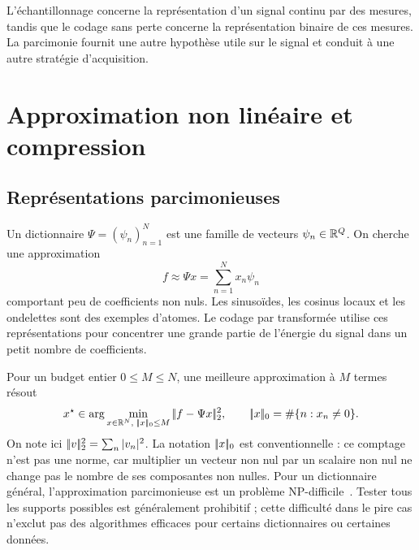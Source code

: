 L'échantillonnage concerne la représentation d'un signal continu par des mesures, tandis que le codage sans perte concerne la représentation binaire de ces mesures. La parcimonie fournit une autre hypothèse utile sur le signal et conduit à une autre stratégie d'acquisition.

\section{Approximation non linéaire et compression}
\subsection{Représentations parcimonieuses}
Un dictionnaire $\Psi=(\psi_n)_{n=1}^N$ est une famille de vecteurs $\psi_n\in\mathbb{R}^Q$. On cherche une approximation
\[
 f\approx\Psi x=\sum_{n=1}^N x_n\psi_n
\]
comportant peu de coefficients non nuls. Les sinusoïdes, les cosinus locaux et les ondelettes sont des exemples d'atomes. Le codage par transformée utilise ces représentations pour concentrer une grande partie de l'énergie du signal dans un petit nombre de coefficients.

Pour un budget entier $0\le M\le N$, une meilleure approximation à $M$ termes résout
\begin{equation}\label{eq-pbm-approx}
 x^\star\in\arg\min_{x\in\mathbb{R}^N,\;|\!| x |\!|_0\le M}|\!| f-\Psi x |\!|_2^2,
 \qquad |\!| x |\!|_0=\#\{n:x_n\ne0\}.
\end{equation}
On note ici $|\!| v |\!|_2^2=\sum_n|v_n|^2$. La notation $|\!| x |\!|_0$ est conventionnelle : ce comptage n'est pas une norme, car multiplier un vecteur non nul par un scalaire non nul ne change pas le nombre de ses composantes non nulles. Pour un dictionnaire général, l'approximation parcimonieuse est un problème NP-difficile~\cite{Natarajan95}. Tester tous les supports possibles est généralement prohibitif ; cette difficulté dans le pire cas n'exclut pas des algorithmes efficaces pour certains dictionnaires ou certaines données.

